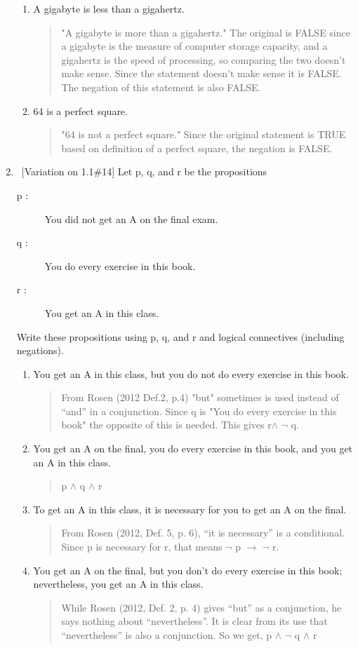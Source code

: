 \documentclass[10pt]{article}
\newcommand{\desclist}[1]{\begin{description}#1\end{description}}
\newcommand{\Answer}[1]{\begin{quote}{\color{blue}#1}\end{quote}}
\begin{document}
\begin{enumerate}
\begin{enumerate}
\item A gigabyte is less than a gigahertz.\qquad [5 points]
\Answer{"A gigabyte is more than a gigahertz." The original is FALSE since a gigabyte is the measure of computer storage capacity, and a gigahertz is the speed of processing, so comparing the two doesn't make sense. Since the statement doesn't make sense it is FALSE. The negation of this statement is also FALSE. }

\item 64 is a perfect square. \qquad [5 points]
\Answer{"64 is not a perfect square." Since the original statement is TRUE based on definition of a perfect square, the negation is FALSE.}

\end{enumerate}

\item \ [Variation on 1.1\#14] Let p, q, and r be the propositions
\desclist{
\item[p :] You did not get an A on the final exam.
\item[q :] You do every exercise in this book.
\item[r :] You get an A in this class.
}
Write these propositions using p, q, and r and logical connectives (including negations).
\begin{enumerate}
\item You get an A in this class, but you do not do every exercise in this book.\qquad [5 points]
\Answer{From Rosen (2012 Def.2, p.4) "but" sometimes is used instead of “and” in a conjunction. Since q is "You do every exercise in this book" the opposite of this is needed. This gives r$\wedge$ $\neg$ q.}

\item You get an A on the final, you do every exercise in this book, and you get an A in this class.\qquad [5 points]
\Answer{p $\wedge$ q $\wedge$ r}

\item To get an A in this class, it is necessary for you to get an A on the final.\qquad [5 points]
\Answer{From Rosen (2012, Def. 5, p. 6), “it is necessary” is a conditional. Since p is necessary for r, that means $\neg$ p $\rightarrow$ $\neg$ r.}

\item You get an A on the final, but you don't do every exercise in this book; nevertheless, you get an A in this class.\qquad [5 points]
\Answer{ While Rosen (2012, Def. 2, p. 4) gives “but” as a conjunction, he says nothing about “nevertheless”. It is clear from its use that “nevertheless” is also a conjunction. So we get, p $\wedge$ $\neg$ q $\wedge$ r}


\end{enumerate}
\end{enumerate}
\end{document}
